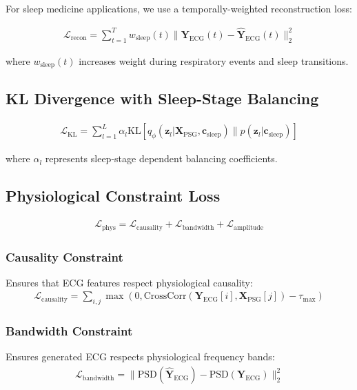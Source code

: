 \documentclass[11pt,en]{elegantpaper}
\begin{document}
For sleep medicine applications, we use a temporally-weighted reconstruction loss:

\begin{align}
\mathcal{L}_{\text{recon}} = \sum_{t=1}^T w_{\text{sleep}}(t) \|\mathbf{Y}_{\text{ECG}}(t) - \hat{\mathbf{Y}}_{\text{ECG}}(t)\|_2^2
\end{align}

where $w_{\text{sleep}}(t)$ increases weight during respiratory events and sleep transitions.

\subsection{KL Divergence with Sleep-Stage Balancing}

\begin{align}
\mathcal{L}_{\text{KL}} = \sum_{l=1}^L \alpha_l \text{KL}[q_\phi(\mathbf{z}_l | \mathbf{X}_{\text{PSG}}, \mathbf{c}_{\text{sleep}}) \| p(\mathbf{z}_l | \mathbf{c}_{\text{sleep}})]
\end{align}

where $\alpha_l$ represents sleep-stage dependent balancing coefficients.

\subsection{Physiological Constraint Loss}

\begin{align}
\mathcal{L}_{\text{phys}} = \mathcal{L}_{\text{causality}} + \mathcal{L}_{\text{bandwidth}} + \mathcal{L}_{\text{amplitude}}
\end{align}

\subsubsection{Causality Constraint}
Ensures that ECG features respect physiological causality:
\begin{align}
\mathcal{L}_{\text{causality}} = \sum_{i,j} \max(0, \text{CrossCorr}(\mathbf{Y}_{\text{ECG}}[i], \mathbf{X}_{\text{PSG}}[j]) - \tau_{\max})
\end{align}

\subsubsection{Bandwidth Constraint}
Ensures generated ECG respects physiological frequency bands:
\begin{align}
\mathcal{L}_{\text{bandwidth}} = \|\text{PSD}(\hat{\mathbf{Y}}_{\text{ECG}}) - \text{PSD}(\mathbf{Y}_{\text{ECG}})\|_2^2
\end{align}
\end{document}
